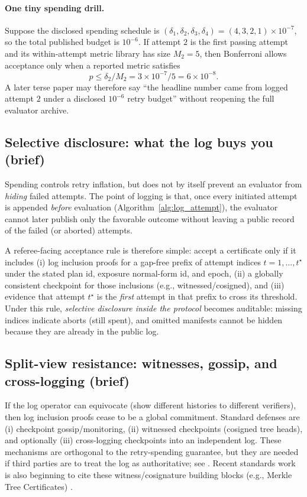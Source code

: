 \documentclass[11pt]{article}
\begin{document}
\paragraph{One tiny spending drill.}
Suppose the disclosed spending schedule is $(\delta_1,\delta_2,\delta_3,\delta_4)=(4,3,2,1)\times 10^{-7}$, so the total published budget is $10^{-6}$.
If attempt $2$ is the first passing attempt and its within-attempt metric library has size $M_2=5$, then Bonferroni allows acceptance only when a reported metric satisfies
\[
p \le \delta_2/M_2 = 3\times 10^{-7}/5 = 6\times 10^{-8}.
\]
A later terse paper may therefore say ``the headline number came from logged attempt $2$ under a disclosed $10^{-6}$ retry budget'' without reopening the full evaluator archive.

\subsection{Selective disclosure: what the log buys you (brief)}
Spending controls retry inflation, but does not by itself prevent an evaluator from \emph{hiding} failed attempts.
The point of logging is that, once every initiated attempt is appended \emph{before} evaluation (Algorithm~\ref{alg:log_attempt}),
the evaluator cannot later publish only the favorable outcome without leaving a public record of the failed (or aborted) attempts.

A referee-facing acceptance rule is therefore simple:
accept a certificate only if it includes (i) log inclusion proofs for a gap-free prefix of attempt indices $t=1,\dots,t^\star$ under the stated plan id, exposure normal-form id, and epoch,
(ii) a globally consistent checkpoint for those inclusions (e.g., witnessed/cosigned), and
(iii) evidence that attempt $t^\star$ is the \emph{first} attempt in that prefix to cross its threshold.
Under this rule, \emph{selective disclosure inside the protocol} becomes auditable: missing indices indicate aborts (still spent), and omitted manifests cannot be hidden because they are already in the public log.

\subsection{Split-view resistance: witnesses, gossip, and cross-logging (brief)}
If the log operator can equivocate (show different histories to different verifiers), then log inclusion proofs cease to be a global commitment.
Standard defenses are (i) checkpoint gossip/monitoring, (ii) witnessed checkpoints (cosigned tree heads), and optionally (iii) cross-logging checkpoints into an independent log.
These mechanisms are orthogonal to the retry-spending guarantee, but they are needed if third parties are to treat the log as authoritative; see \cite{dahlberg2018ctgossip,syta2016cosi,dirksen2021logpicker,hicks2023sok_transparency}. Recent standards work is also beginning to cite these witness/cosignature building blocks (e.g., Merkle Tree Certificates) \cite{ietf_plants_merkle_tree_certs}.
\end{document}
